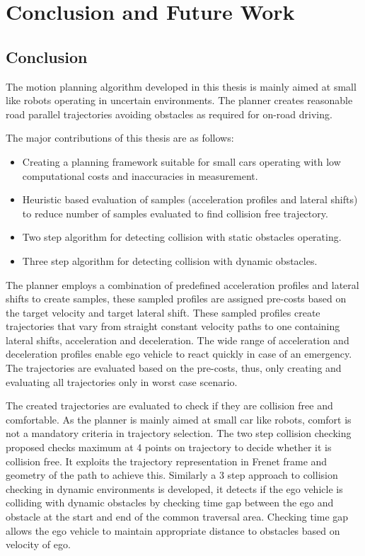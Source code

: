 \chapter{Conclusion and Future Work}
\label{conclusion}
\section{Conclusion}

The motion planning algorithm developed in this thesis is mainly aimed at small like robots operating in uncertain environments. The planner creates reasonable road parallel trajectories avoiding obstacles as required for on-road driving. 

The major contributions of this thesis are as follows:

\begin{itemize}
	\item Creating a planning framework suitable for small cars operating with low computational costs and inaccuracies in measurement. 
	\item Heuristic based evaluation of samples (acceleration profiles and lateral shifts) to reduce number of samples evaluated to find collision free trajectory. 
	\item Two step algorithm for detecting collision with static obstacles operating.
	\item Three step algorithm for detecting collision with dynamic obstacles.
\end{itemize}

The planner employs a combination of predefined acceleration profiles and lateral shifts to create samples, these sampled profiles are assigned pre-costs based on the target velocity and target lateral shift. These sampled profiles create trajectories that vary from straight constant velocity paths to one containing lateral shifts, acceleration and deceleration. The wide range of acceleration and deceleration profiles enable ego vehicle to react quickly in case of an emergency. The trajectories are evaluated based on the pre-costs, thus, only creating and evaluating all trajectories only in worst case scenario. 

The created trajectories are evaluated to check if they are collision free and comfortable. As the planner is mainly aimed at small car like robots, comfort is not a mandatory criteria in trajectory selection. The two step collision checking proposed checks maximum at 4 points on trajectory to decide whether it is collision free. It exploits the trajectory representation in Frenet frame and geometry of the path to achieve this. Similarly a 3 step approach to collision checking in dynamic environments is developed, it detects if the ego vehicle is colliding with dynamic obstacles by checking time gap between the ego and obstacle at the start and end of the common traversal area. Checking time gap allows the ego vehicle to maintain appropriate distance to obstacles based on velocity of ego. 

